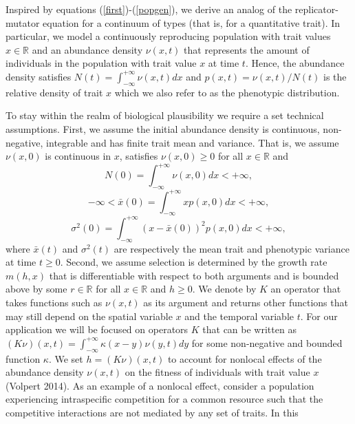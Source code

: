 \documentclass[]{article}
\begin{document}
Inspired by equations (\ref{first})-(\ref{popgen}), we derive an analog
of the replicator-mutator equation for a continuum of types (that is,
for a quantitative trait). In particular, we model a continuously
reproducing population with trait values \(x\in\mathbb{R}\) and an
abundance density \(\nu(x,t)\) that represents the amount of individuals
in the population with trait value \(x\) at time \(t\). Hence, the
abundance density satisfies \(N(t)=\int_{-\infty}^{+\infty}\nu(x,t)dx\)
and \(p(x,t)=\nu(x,t)/N(t)\) is the relative density of trait \(x\)
which we also refer to as the phenotypic distribution.

To stay within the realm of biological plausibility we require a set
technical assumptions. First, we assume the initial abundance density is
continuous, non-negative, integrable and has finite trait mean and
variance. That is, we assume \(\nu(x,0)\) is continuous in \(x\),
satisfies \(\nu(x,0)\geq0\) for all \(x\in\mathbb{R}\) and
\begin{equation}
N(0)=\int_{-\infty}^{+\infty}\nu(x,0)dx<+\infty,
\end{equation} \begin{equation}
-\infty<\bar x(0)=\int_{-\infty}^{+\infty}xp(x,0)dx<+\infty,
\end{equation} \begin{equation}
\sigma^2(0)=\int_{-\infty}^{+\infty}(x-\bar x(0))^2p(x,0)dx<+\infty,
\end{equation} where \(\bar x(t)\) and \(\sigma^2(t)\) are respectively
the mean trait and phenotypic variance at time \(t\geq0\). Second, we
assume selection is determined by the growth rate \(m(h,x)\) that is
differentiable with respect to both arguments and is bounded above by
some \(r\in\mathbb{R}\) for all \(x\in\mathbb{R}\) and \(h\geq0\). We
denote by \(K\) an operator that takes functions such as \(\nu(x,t)\) as
its argument and returns other functions that may still depend on the
spatial variable \(x\) and the temporal variable \(t\). For our
application we will be focused on operators \(K\) that can be written as
\((K\nu)(x,t)=\int_{-\infty}^{+\infty}\kappa(x-y)\nu(y,t)dy\) for some
non-negative and bounded function \(\kappa\). We set \(h=(K\nu)(x,t)\)
to account for nonlocal effects of the abundance density \(\nu(x,t)\) on
the fitness of individuals with trait value \(x\) (Volpert 2014). As an
example of a nonlocal effect, consider a population experiencing
intraspecific competition for a common resource such that the
competitive interactions are not mediated by any set of traits. In this
\end{document}
